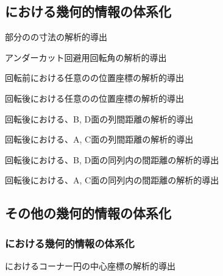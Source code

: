 \clearpage
\subsection{\DimpleMilling における幾何的情報の体系化}
\begin{enumerate}[label={\sarrow[red]}]
\item \Dimple 部分の\InnerDiameter の寸法の解析的導出
\item {}アンダーカット回避用\Table 回転角の解析的導出
\item \Table 回転前における任意の\Dimple の位置座標の解析的導出
\item \Table 回転後における任意の\Dimple の位置座標の解析的導出
\item \Table 回転後における、B, D面の\Dimple 列間距離の解析的導出
\item \Table 回転後における、A, C面の\Dimple 列間距離の解析的導出
\item \Table 回転後における、B, D面の同列内の\Dimple 間距離の解析的導出
\item \Table 回転後における、A, C面の同列内の\Dimple 間距離の解析的導出
\end{enumerate}


\subsection{その他の幾何的情報の体系化}

\subsubsection{\EndFaceBoringMilling における幾何的情報の体系化}
\begin{enumerate}[label={\sarrow[red]}]
\item[\sarrow] \EndFaceBoring におけるコーナー円の中心座標の解析的導出
\end{enumerate}

